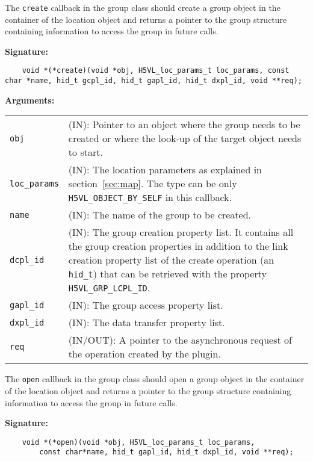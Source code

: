 The {\tt create} callback in the group class should create a group
object in the container of the location object and returns a pointer
to the group structure containing information to access the group in
future calls.

\textbf{Signature:}
\begin{lstlisting}
    void *(*create)(void *obj, H5VL_loc_params_t loc_params, const char *name, hid_t gcpl_id, hid_t gapl_id, hid_t dxpl_id, void **req);
\end{lstlisting}

\textbf{Arguments:}\\
\begin{tabular}{l p{10cm}}
  {\tt obj} & (IN): Pointer to an object where the group needs
  to be created or where the look-up of the target object needs to
  start.\\
  {\tt loc\_params} & (IN): The location parameters as explained in
  section~\ref{sec:map}. The type can be only {\tt
    H5VL\_OBJECT\_BY\_SELF} in this callback. \\
  {\tt name} & (IN): The name of the group to be created.\\
  {\tt dcpl\_id} & (IN): The group creation property list. It contains
  all the group creation properties in addition to the link creation
  property list of the create operation (an {\tt hid\_t}) that can be
  retrieved with the property {\tt H5VL\_GRP\_LCPL\_ID}.\\
  {\tt gapl\_id} & (IN): The group access property list.\\
  {\tt dxpl\_id} & (IN): The data transfer property list.\\
  {\tt req} & (IN/OUT): A pointer to the asynchronous request of the
  operation created by the plugin.\\
\end{tabular}

The {\tt open} callback in the group class should open a group object
in the container of the location object and returns a pointer to the
group structure containing information to access the group in future
calls.

\textbf{Signature:}
\begin{lstlisting}
    void *(*open)(void *obj, H5VL_loc_params_t loc_params, 
        const char*name, hid_t gapl_id, hid_t dxpl_id, void **req);
\end{lstlisting}

